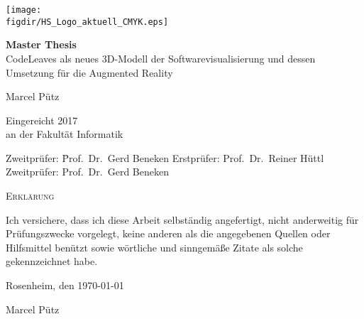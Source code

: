 \begin{titlepage}

\raggedleft

\texttt{[image: \\figdir/HS\_Logo\_aktuell\_CMYK.eps]}

\vfill

\centering
\LARGE
\textbf{Master Thesis}
\vspace{1cm}\\

\LARGE
CodeLeaves als neues 3D-Modell der Softwarevisualisierung und dessen Umsetzung für die Augmented Reality
\vspace{1cm}

\Large
Marcel Pütz
\vspace{1cm}

\flushleft
\Large
\vspace*{\fill}

Eingereicht 2017 \\
an der Fakultät Informatik
\begin{tabbing}
Zweitprüfer: \= Prof.\ Dr.\ Gerd Beneken\kill
Erstprüfer: \> Prof.\ Dr.\ Reiner Hüttl\\
Zweitprüfer: \> Prof.\ Dr.\ Gerd Beneken
\end{tabbing}

\end{titlepage}

\cleardoubleemptypage

{
\large
\thispagestyle{empty}
\vspace*{\fill}

\noindent
\textsc{Erklärung}

\medskip

\noindent
Ich versichere, dass ich diese Arbeit selbständig
angefertigt, nicht anderweitig für Prüfungszwecke
vorgelegt, keine anderen als die angegebenen Quellen
oder Hilfsmittel benützt sowie wörtliche und
sinngemäße Zitate als solche gekennzeichnet habe.

\bigskip

\noindent
Rosenheim, den \today

\vspace*{2cm}

\noindent
Marcel Pütz
}

